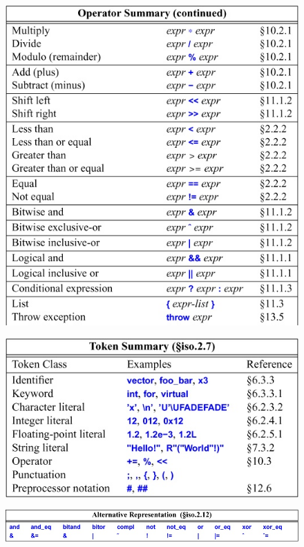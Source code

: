 \documentclass[11pt,a4paper]{book}
\begin{document}
\begin{figure}[h!]
	\begin{center}
		\includegraphics[scale=0.6]{img/019.jpg}
		\label{fig: 019}
	\end{center}
\end{figure}
\begin{figure}[h!]
	\begin{center}
		\includegraphics[scale=0.6]{img/020.jpg}
		\label{fig: 020}
	\end{center}
\end{figure}
\begin{figure}[h!]
	\begin{center}
		\includegraphics[scale=0.6]{img/021.jpg}
		\label{fig: 021}
	\end{center}
\end{figure}
\end{document}
